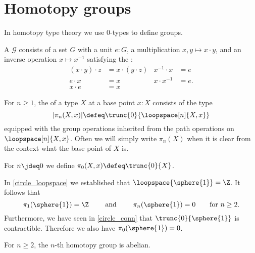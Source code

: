 \section{Homotopy groups}
In homotopy type theory we use $0$-types to define groups.
\begin{defn}
A  $\mathcal{G}$ consists of a set $G$ with a unit $e:G$, a multiplication $x,y\mapsto x\cdot y$, and an inverse operation $x\mapsto x^{-1}$ satisfying the :
\begin{align*}
(x\cdot y)\cdot z & =x\cdot(y\cdot z) & x^{-1}\cdot x & = e \\
e\cdot x & = x & x\cdot x^{-1} & = e. \\
x\cdot e & =x
\end{align*}
\end{defn}

\begin{defn}
For $n\geq 1$, the  of a type $X$ at a base point $x:X$ consists of the type
\begin{equation*}
|\pi_n(X,x)| \defeq \trunc{0}{\loopspace[n]{X,x}}
\end{equation*}
equipped with the group operations inherited from the path operations on $\loopspace[n]{X,x}$. 
Often we will simply write $\pi_n(X)$ when it is clear from the context what the base point of $X$ is.

For $n\jdeq 0$ we define $\pi_0(X,x)\defeq \trunc{0}{X}$. 
\end{defn}

\begin{eg}
In \autoref{circle_loopspace} we established that $\loopspace{\sphere{1}}=\Z$. It follows that
\begin{equation*}
\pi_1(\sphere{1})=\Z \qquad\text{ and }\qquad\pi_n(\sphere{1})=0\qquad\text{for $n\geq 2$.}
\end{equation*}
Furthermore, we have seen in \autoref{circle_conn} that $\trunc{0}{\sphere{1}}$ is contractible. 
Therefore we also have $\pi_0(\sphere{1})=0$.
\end{eg}

\begin{thm}
For $n\geq 2$, the $n$-th homotopy group is abelian.
\end{thm}

